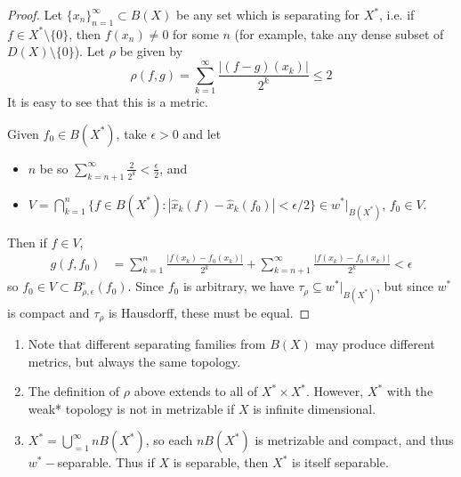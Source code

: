 \documentclass[11pt, a4paper]{memoir}
\theoremstyle{change}
\theoremstyle{plain}
\theoremstyle{nonumberplain}
\newtheorem{proof}{Proof}
\numberwithin{equation}{section}
\begin{document}
\begin{proof}
    Let $\{x_n\}_{n=1}^\infty\subset B(X)$ be any set which is separating for $X^*$, i.e. if $f\in X^*\setminus\{0\}$, then $f(x_n)\neq 0$ for some $n$ (for example, take any dense subset of $D(X)\setminus\{0\}$).
    Let $\rho$ be given by
    \begin{equation*}
        \rho(f,g)=\sum_{k=1}^\infty\frac{|(f-g)(x_k)|}{2^k}\leq 2
    \end{equation*}
    It is easy to see that this is a metric.

    Given $f_0\in B(X^*)$, take $\epsilon>0$ and let
    \begin{itemize}[nl]
        \item $n$ be so $\sum_{k=n+1}^\infty\frac{2}{2^k}<\frac{\epsilon}{2}$, and
        \item $V=\bigcap_{k=1}^n\{f\in B(X^*):|\hat x_k(f)-\hat x_k(f_0)|<\epsilon/2\}\in w^*|_{B(X^*)}$, $f_0\in V$.
    \end{itemize}
    Then if $f\in V$,
    \begin{align*}
        g(f,f_0) &= \sum_{k=1}^n\frac{|f(x_k)-f_0(x_k)|}{2^k}+\sum_{k=n+1}^\infty\frac{|f(x_k)-f_0(x_k)|}{2^k}<\epsilon
    \end{align*}
    so $f_0\in V\subset B^\circ_{\rho,\epsilon}(f_0)$.
    Since $f_0$ is arbitrary, we have $\tau_\rho\subseteq w^*|_{B(X^*)}$, but since $w^*$ is compact and $\tau_\rho$ is Hausdorff, these must be equal.
\end{proof}
\begin{enumerate}[nl,r]
    \item Note that different separating families from $B(X)$ may produce different metrics, but always the same topology.
    \item The definition of $\rho$ above extends to all of $X^*\times X^*$.
        However, $X^*$ with the weak* topology is not in metrizable if $X$ is infinite dimensional.
    \item $X^*=\bigcup_{=1}^\infty nB(X^*)$, so each $nB(X^*)$ is metrizable and compact, and thus $w^*-$separable.
        Thus if $X$ is separable, then $X^*$ is itself separable.
\end{enumerate}
\end{document}
